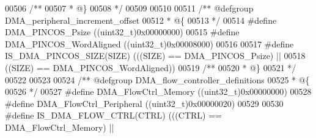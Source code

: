 \begin{DoxyCode}
00506 \textcolor{comment}{/**}
00507 \textcolor{comment}{  * @\}}
00508 \textcolor{comment}{  */}
00509 
00510 
00511 \textcolor{comment}{/** @defgroup DMA\_peripheral\_increment\_offset }
00512 \textcolor{comment}{  * @\{}
00513 \textcolor{comment}{  */}
00514 \textcolor{preprocessor}{#}\textcolor{preprocessor}{define} \textcolor{preprocessor}{DMA\_PINCOS\_Psize}                  \textcolor{preprocessor}{(}\textcolor{preprocessor}{(}\textcolor{preprocessor}{uint32\_t}\textcolor{preprocessor}{)}0x00000000\textcolor{preprocessor}{)}
00515 \textcolor{preprocessor}{#}\textcolor{preprocessor}{define} \textcolor{preprocessor}{DMA\_PINCOS\_WordAligned}            \textcolor{preprocessor}{(}\textcolor{preprocessor}{(}\textcolor{preprocessor}{uint32\_t}\textcolor{preprocessor}{)}0x00008000\textcolor{preprocessor}{)}
00516 
00517 \textcolor{preprocessor}{#}\textcolor{preprocessor}{define} \textcolor{preprocessor}{IS\_DMA\_PINCOS\_SIZE}\textcolor{preprocessor}{(}\textcolor{preprocessor}{SIZE}\textcolor{preprocessor}{)} \textcolor{preprocessor}{(}\textcolor{preprocessor}{(}\textcolor{preprocessor}{(}\textcolor{preprocessor}{SIZE}\textcolor{preprocessor}{)} \textcolor{preprocessor}{==} DMA_PINCOS_Psize\textcolor{preprocessor}{)} \textcolor{preprocessor}{||}
00518                                   \textcolor{preprocessor}{(}\textcolor{preprocessor}{(}\textcolor{preprocessor}{SIZE}\textcolor{preprocessor}{)} \textcolor{preprocessor}{==} DMA_PINCOS_WordAligned\textcolor{preprocessor}{)}\textcolor{preprocessor}{)}
00519 \textcolor{comment}{/**}
00520 \textcolor{comment}{  * @\}}
00521 \textcolor{comment}{  */}
00522 
00523 
00524 \textcolor{comment}{/** @defgroup DMA\_flow\_controller\_definitions }
00525 \textcolor{comment}{  * @\{}
00526 \textcolor{comment}{  */}
00527 \textcolor{preprocessor}{#}\textcolor{preprocessor}{define} \textcolor{preprocessor}{DMA\_FlowCtrl\_Memory}               \textcolor{preprocessor}{(}\textcolor{preprocessor}{(}\textcolor{preprocessor}{uint32\_t}\textcolor{preprocessor}{)}0x00000000\textcolor{preprocessor}{)}
00528 \textcolor{preprocessor}{#}\textcolor{preprocessor}{define} \textcolor{preprocessor}{DMA\_FlowCtrl\_Peripheral}           \textcolor{preprocessor}{(}\textcolor{preprocessor}{(}\textcolor{preprocessor}{uint32\_t}\textcolor{preprocessor}{)}0x00000020\textcolor{preprocessor}{)}
00529 
00530 \textcolor{preprocessor}{#}\textcolor{preprocessor}{define} \textcolor{preprocessor}{IS\_DMA\_FLOW\_CTRL}\textcolor{preprocessor}{(}\textcolor{preprocessor}{CTRL}\textcolor{preprocessor}{)} \textcolor{preprocessor}{(}\textcolor{preprocessor}{(}\textcolor{preprocessor}{(}\textcolor{preprocessor}{CTRL}\textcolor{preprocessor}{)} \textcolor{preprocessor}{==} DMA_FlowCtrl_Memory\textcolor{preprocessor}{)} \textcolor{preprocessor}{||}

\end{DoxyCode}
